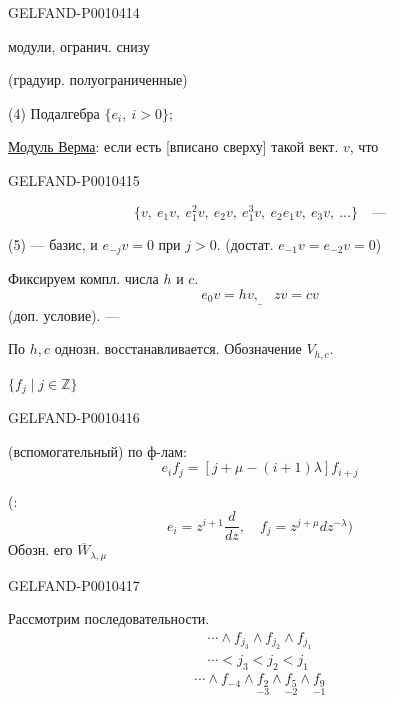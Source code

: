 \begin{GelfandAdjacentEvidence}{GELFAND-P001041}{4}

модули, огранич. снизу

(градуир. полуограниченные)

(4) Подалгебра $\{e_i,\ i>0\}$;

\underline{Модуль Верма}: если есть [вписано сверху] такой вект. $v$, что
\end{GelfandAdjacentEvidence}
\begin{GelfandAdjacentEvidence}{GELFAND-P001041}{5}

\[
\{v,\ e_1v,\ e_1^2v,\ e_2v,\ e_1^3v,\ e_2e_1v,\ e_3v,\ \ldots\}\quad\text{---}
\]

(5) --- базис, и $e_{-j}v=0$ при $j>0$.
(достат. $e_{-1}v=e_{-2}v=0$)

Фиксируем компл. числа $h$ и $c$.
\begin{equation*}
\underline{e_0v=hv,\quad zv=cv}
\tag{6}
\end{equation*}
(доп. условие). ---

По $h,c$ однозн. восстанавливается. Обозначение $V_{h,c}$.

 $\{f_j\mid j\in\mathbb Z\}$
\end{GelfandAdjacentEvidence}
\begin{GelfandAdjacentEvidence}{GELFAND-P001041}{6}

(вспомогательный) по ф-лам:
\begin{equation*}
e_if_j=[j+\mu-(i+1)\lambda]f_{i+j}
\tag{7}
\end{equation*}

(:
\begin{equation*}
e_i=z^{i+1}\frac{d}{dz},\quad f_j=z^{j+\mu}dz^{-\lambda})
\tag{8}
\end{equation*}
Обозн. его $\overline W_{\lambda,\mu}$
\end{GelfandAdjacentEvidence}
\begin{GelfandAdjacentEvidence}{GELFAND-P001041}{7}


Рассмотрим последовательности.
\begin{equation*}
\begin{gathered}
\cdots\wedge f_{j_3}\wedge f_{j_2}\wedge f_{j_1}\\
\cdots<j_3<j_2<j_1
\end{gathered}
\tag{9}
\end{equation*}
\[
\cdots\wedge f_{-4}\wedge\underset{-3}{f_2}\wedge\underset{-2}{f_5}\wedge\underset{-1}{f_9}
\]
\end{GelfandAdjacentEvidence}
